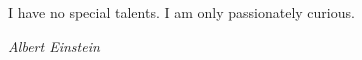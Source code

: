 \begin{shadequote}
I have no special talents. I am only passionately curious.\par\emph{Albert Einstein}
\end{shadequote}




